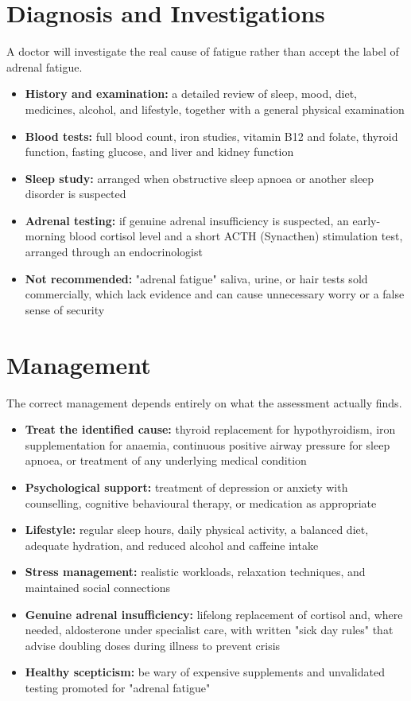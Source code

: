 \section*{Diagnosis and Investigations}
A doctor will investigate the real cause of fatigue rather than accept the label of adrenal fatigue.

\begin{itemize}
    \item \textbf{History and examination:} a detailed review of sleep, mood, diet, medicines, alcohol, and lifestyle, together with a general physical examination
    \item \textbf{Blood tests:} full blood count, iron studies, vitamin B12 and folate, thyroid function, fasting glucose, and liver and kidney function
    \item \textbf{Sleep study:} arranged when obstructive sleep apnoea or another sleep disorder is suspected
    \item \textbf{Adrenal testing:} if genuine adrenal insufficiency is suspected, an early-morning blood cortisol level and a short ACTH (Synacthen) stimulation test, arranged through an endocrinologist
    \item \textbf{Not recommended:} "adrenal fatigue" saliva, urine, or hair tests sold commercially, which lack evidence and can cause unnecessary worry or a false sense of security
\end{itemize}

\section*{Management}
The correct management depends entirely on what the assessment actually finds.

\begin{itemize}
    \item \textbf{Treat the identified cause:} thyroid replacement for hypothyroidism, iron supplementation for anaemia, continuous positive airway pressure for sleep apnoea, or treatment of any underlying medical condition
    \item \textbf{Psychological support:} treatment of depression or anxiety with counselling, cognitive behavioural therapy, or medication as appropriate
    \item \textbf{Lifestyle:} regular sleep hours, daily physical activity, a balanced diet, adequate hydration, and reduced alcohol and caffeine intake
    \item \textbf{Stress management:} realistic workloads, relaxation techniques, and maintained social connections
    \item \textbf{Genuine adrenal insufficiency:} lifelong replacement of cortisol and, where needed, aldosterone under specialist care, with written "sick day rules" that advise doubling doses during illness to prevent crisis
    \item \textbf{Healthy scepticism:} be wary of expensive supplements and unvalidated testing promoted for "adrenal fatigue"
\end{itemize}

